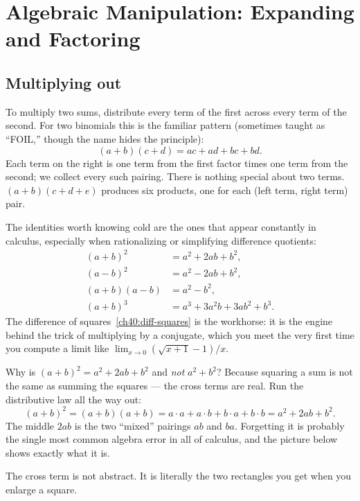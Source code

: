 \section{Algebraic Manipulation: Expanding and Factoring}
\label{ch40:factoring}

\subsection{Multiplying out}

To multiply two sums, distribute every term of the first across every term of the
second. For two binomials this is the familiar pattern (sometimes taught as
``FOIL,'' though the name hides the principle):
\[
  (a+b)(c+d) = ac + ad + bc + bd.
\]
Each term on the right is one term from the first factor times one term from the
second; we collect every such pairing. There is nothing special about two terms.
$(a+b)(c+d+e)$ produces six products, one for each (left term, right term) pair.

The identities worth knowing cold are the ones that appear constantly in
calculus, especially when rationalizing or simplifying difference quotients:
\begin{align}
  (a+b)^2 &= a^2 + 2ab + b^2, \label{ch40:square-sum}\\
  (a-b)^2 &= a^2 - 2ab + b^2, \\
  (a+b)(a-b) &= a^2 - b^2, \label{ch40:diff-squares}\\
  (a+b)^3 &= a^3 + 3a^2 b + 3ab^2 + b^3.
\end{align}
The difference of squares~\eqref{ch40:diff-squares} is the workhorse: it is the
engine behind the trick of multiplying by a conjugate, which you meet the very
first time you compute a limit like $\lim_{x\to 0}(\sqrt{x+1}-1)/x$.

\begin{whybox}
Why is $(a+b)^2 = a^2 + 2ab + b^2$ and \emph{not} $a^2 + b^2$? Because squaring a
sum is not the same as summing the squares --- the cross terms are real. Run the
distributive law all the way out:
\[
  (a+b)^2 = (a+b)(a+b) = a\cdot a + a \cdot b + b \cdot a + b \cdot b
          = a^2 + 2ab + b^2.
\]
The middle $2ab$ is the two ``mixed'' pairings $ab$ and $ba$. Forgetting it is
probably the single most common algebra error in all of calculus, and the
picture below shows exactly what it is.
\end{whybox}

The cross term is not abstract. It is literally the two rectangles you get when
you enlarge a square.

